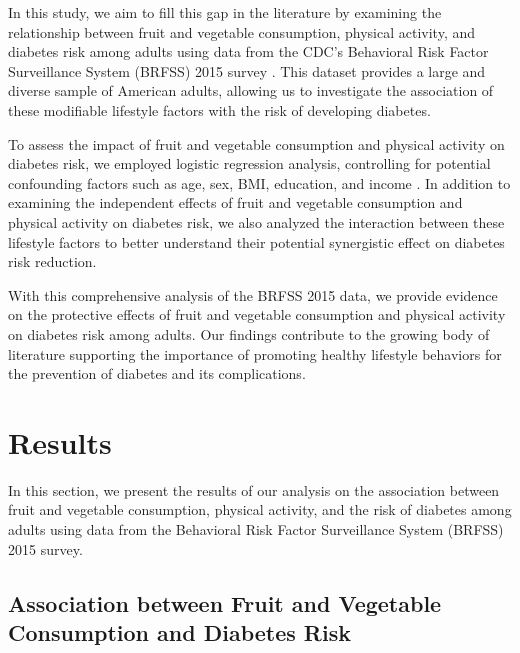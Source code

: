 \documentclass[11pt]{article}
\begin{document}
In this study, we aim to fill this gap in the literature by examining the relationship between fruit and vegetable consumption, physical activity, and diabetes risk among adults using data from the CDC's Behavioral Risk Factor Surveillance System (BRFSS) 2015 survey \cite{Flores-Hernndez2015QualityOD,Iachan2016NationalWO}. This dataset provides a large and diverse sample of American adults, allowing us to investigate the association of these modifiable lifestyle factors with the risk of developing diabetes.

To assess the impact of fruit and vegetable consumption and physical activity on diabetes risk, we employed logistic regression analysis, controlling for potential confounding factors such as age, sex, BMI, education, and income \cite{Gomes-Neto2019FruitAV}. In addition to examining the independent effects of fruit and vegetable consumption and physical activity on diabetes risk, we also analyzed the interaction between these lifestyle factors to better understand their potential synergistic effect on diabetes risk reduction.

With this comprehensive analysis of the BRFSS 2015 data, we provide evidence on the protective effects of fruit and vegetable consumption and physical activity on diabetes risk among adults. Our findings contribute to the growing body of literature supporting the importance of promoting healthy lifestyle behaviors for the prevention of diabetes and its complications.

\section*{Results}

In this section, we present the results of our analysis on the association between fruit and vegetable consumption, physical activity, and the risk of diabetes among adults using data from the Behavioral Risk Factor Surveillance System (BRFSS) 2015 survey.

\subsection*{Association between Fruit and Vegetable Consumption and Diabetes Risk}
\end{document}
